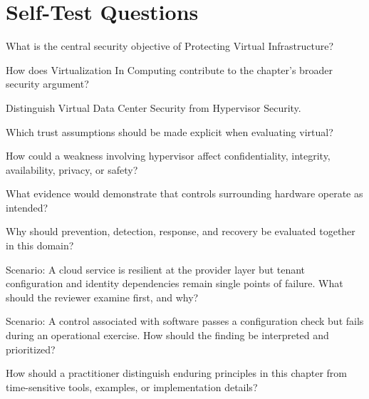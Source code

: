 \documentclass[11pt,letterpaper]{article}
\begin{document}
\section*{Self-Test Questions}
\begin{CornellRecallList}
\item What is the central security objective of Protecting Virtual Infrastructure?
\item How does Virtualization In Computing contribute to the chapter's broader security argument?
\item Distinguish Virtual Data Center Security from Hypervisor Security.
\item Which trust assumptions should be made explicit when evaluating virtual?
\item How could a weakness involving hypervisor affect confidentiality, integrity, availability, privacy, or safety?
\item What evidence would demonstrate that controls surrounding hardware operate as intended?
\item Why should prevention, detection, response, and recovery be evaluated together in this domain?
\item Scenario: A cloud service is resilient at the provider layer but tenant configuration and identity dependencies remain single points of failure. What should the reviewer examine first, and why?
\item Scenario: A control associated with software passes a configuration check but fails during an operational exercise. How should the finding be interpreted and prioritized?
\item How should a practitioner distinguish enduring principles in this chapter from time-sensitive tools, examples, or implementation details?
\end{CornellRecallList}
\end{document}
